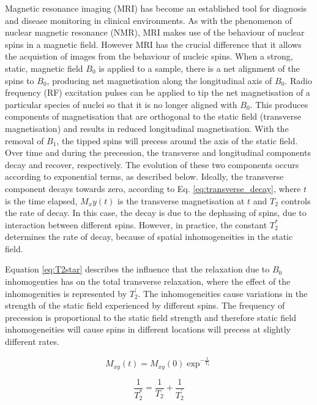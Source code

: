 \documentclass[review]{elsarticle}
\begin{document}
Magnetic resonance imaging (MRI) has become an established tool for diagnosis and disease monitoring in clinical environments. As with the phenomenon of nuclear magnetic resonance (NMR), MRI makes use of the behaviour of nuclear spins in a magnetic field. However MRI has the crucial difference that it allows the acquistion of images from the behaviour of nucleic spins.  When a strong, static, magnetic field $B_0$ is applied to a sample, there is a net alignment of the spins to $B_0 $, producing net magnetisation along the longitudinal axis of $B_0$. Radio frequency (RF) excitation pulses can be applied to tip the net magnetisation of a particular species of nuclei so that it is no longer aligned with $B_0$. This produces components of magnetisation that are orthogonal to the static field (transverse magnetisation) and results in reduced longitudinal magnetisation. With the removal of $B_1$, the tipped spins will precess around the axis of the static field. Over time and during the precession, the transverse and longitudinal components decay and recover, respectively. The evolution of these two components occurs according to exponential terms, as described below. Ideally, the transverse component decays towards zero, according to Eq. \eqref{eq:transverse_decay}, where $t$ is the time elapsed, $M_xy(t)$ is the transverse magnetisation at $t$ and $T_2$ controls the rate of decay. In this case, the decay is due to the dephasing of spins, due to interaction between different spins. However, in practice, the constant $T^{*}_{2}$ determines the rate of decay, because of spatial inhomogeneities in the static field. 

Equation \eqref{eq:T2star} describes the influence that the relaxation due to $B_0$ inhomogenties has on the total transverse relaxation, where the effect of the inhomogenities is represented by $T^{'}_{2}$. The inhomogeneities cause variations in the strength of the static field experienced by different spins. The frequency of precession is proportional to the static field strength and therefore static field inhomogeneities will cause spins in different locations will precess at slightly different rates. 

\begin{equation} \label{eq:transverse_decay}
M_{xy} (t) = M_{xy}(0)\exp^{-\frac{t}{T_{2}}}
\end{equation}

\begin{equation} \label{eq:T2star}
 \frac{1}{T^{*}_{2}} = \frac{1}{T_{2}} + \frac{1}{T^{'}_2}
\end{equation}
\end{document}

